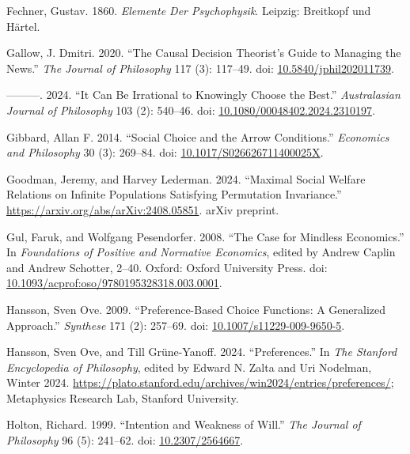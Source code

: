 \documentclass[
  11pt,
  letterpaper,
  DIV=11,
  numbers=noendperiod,
  twoside]{scrartcl}
\newlength{\cslhangindent}
\newenvironment{CSLReferences}[2] %
 {\begin{list}{}{%
  \setlength{\itemindent}{0pt}
  \setlength{\leftmargin}{0pt}
  \setlength{\parsep}{0pt}
  \ifodd #1
   \setlength{\leftmargin}{\cslhangindent}
   \setlength{\itemindent}{-1\cslhangindent}
  \fi
  \setlength{\itemsep}{#2\baselineskip}}}
 {\end{list}}
\begin{document}
\begin{CSLReferences}{1}{0}
Fechner, Gustav. 1860. \emph{Elemente Der Psychophysik}. Leipzig:
Breitkopf und H{ä}rtel.

Gallow, J. Dmitri. 2020. {``The Causal Decision Theorist's Guide to
Managing the News.''} \emph{The Journal of Philosophy} 117 (3): 117--49.
doi:
\href{https://doi.org/10.5840/jphil202011739}{10.5840/jphil202011739}.

---------. 2024. {``It Can Be Irrational to Knowingly Choose the
Best.''} \emph{Australasian Journal of Philosophy} 103 (2): 540--46.
doi:
\href{https://doi.org/10.1080/00048402.2024.2310197}{10.1080/00048402.2024.2310197}.

Gibbard, Allan F. 2014. {``Social Choice and the Arrow Conditions.''}
\emph{Economics and Philosophy} 30 (3): 269--84. doi:
\href{https://doi.org/10.1017/S026626711400025X}{10.1017/S026626711400025X}.

Goodman, Jeremy, and Harvey Lederman. 2024. {``Maximal Social Welfare
Relations on Infinite Populations Satisfying Permutation Invariance.''}
\url{https://arxiv.org/abs/arXiv:2408.05851}. arXiv preprint.

Gul, Faruk, and Wolfgang Pesendorfer. 2008. {``The Case for Mindless
Economics.''} In \emph{Foundations of Positive and Normative Economics},
edited by Andrew Caplin and Andrew Schotter, 2--40. Oxford: Oxford
University Press. doi:
\href{https://doi.org/10.1093/acprof:oso/9780195328318.003.0001}{10.1093/acprof:oso/9780195328318.003.0001}.

Hansson, Sven Ove. 2009. {``Preference-Based Choice Functions: A
Generalized Approach.''} \emph{Synthese} 171 (2): 257--69. doi:
\href{https://doi.org/10.1007/s11229-009-9650-5}{10.1007/s11229-009-9650-5}.

Hansson, Sven Ove, and Till Grüne-Yanoff. 2024. {``{Preferences}.''} In
\emph{The {Stanford} Encyclopedia of Philosophy}, edited by Edward N.
Zalta and Uri Nodelman, {W}inter 2024.
\url{https://plato.stanford.edu/archives/win2024/entries/preferences/};
Metaphysics Research Lab, Stanford University.

Holton, Richard. 1999. {``Intention and Weakness of Will.''} \emph{The
Journal of Philosophy} 96 (5): 241--62. doi:
\href{https://doi.org/10.2307/2564667}{10.2307/2564667}.


\end{CSLReferences}
\end{document}
